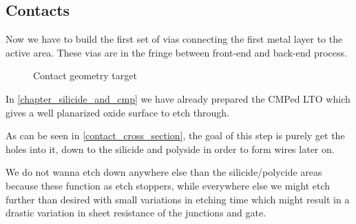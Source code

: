 \subsection{Contacts}\label{chapter_contact}

Now we have to build the first set of vias connecting the first metal layer to the active area.
These vias are in the fringe between front-end and back-end process.

\begin{figure}[H]
	\centering
	\begin{tikzpicture}[node distance = 3cm, auto, thick,scale=\CrossAndTopSectionBig, every node/.style={transform shape}]
		
	\end{tikzpicture}
	\caption{Contact geometry target}
	\label{contact_cross_section}
\end{figure}

In \autoref{chapter_silicide_and_cmp} we have already prepared the CMPed LTO which gives a well planarized oxide surface to
etch through.

As can be seen in \autoref{contact_cross_section}, the goal of this step is purely get the holes into it,
down to the silicide and polyside in order to form wires later on.

We do not wanna etch down anywhere else than the silicide/polycide areas because these function as etch stoppers,
while everywhere else we might etch further than desired with small variations in etching time which might result
in a drastic variation in sheet resistance of the junctions and gate.
